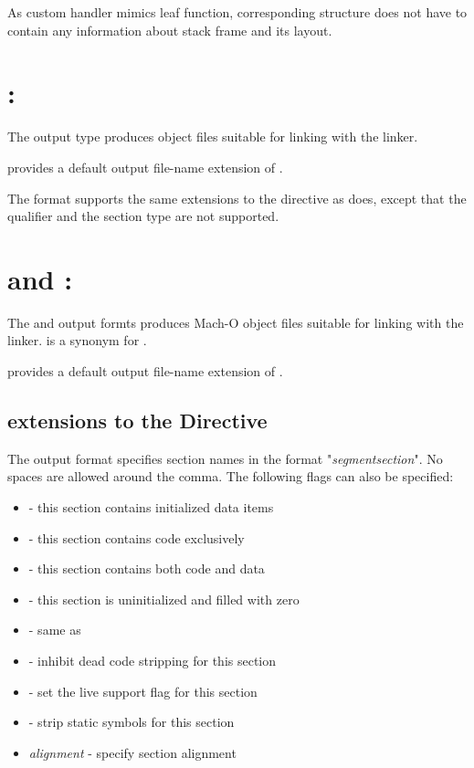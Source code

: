As custom handler mimics leaf function, corresponding 
structure does not have to contain any information about stack frame
and its layout.

\section{: }
\label{sec:cofffmt}

The  output type produces  object files suitable for
linking with the  linker.

 provides a default output file-name extension of .

The  format supports the same extensions to the 
directive as  does, except that the  qualifier and
the  section type are not supported.

\section{ and :
}
\label{sec:machofmt}

The  and  output formts produces Mach-O
object files suitable for linking with the  linker.
 is a synonym for .

 provides a default output file-name extension of .

\subsection{ extensions to the  Directive}
\label{subsec:machosect}

The  output format specifies section names in the format
"\emph{segment}\code{,}\emph{section}". No spaces are allowed around the
comma. The following flags can also be specified:

\begin{itemize}
    \item{ - this section contains initialized data items}
    \item{ - this section contains code exclusively}
    \item{ - this section contains both code and data}
    \item{ - this section is uninitialized and filled with zero}
    \item{ - same as }
    \item{ - inhibit dead code stripping for this section}
    \item{ - set the live support flag for this section}
    \item{ - strip static symbols for this section}
    \item{\emph{alignment} - specify section alignment}
\end{itemize}

